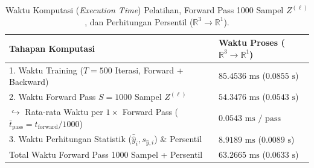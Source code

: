 \documentclass[11pt,a4paper]{article}
\theoremstyle{plain}
\theoremstyle{definition}
\theoremstyle{remark}
\begin{document}
\begin{table}[H]
    \centering
    \small
    \caption{Waktu Komputasi (\textit{Execution Time}) Pelatihan, Forward Pass 1000 Sampel $Z^{(\ell)}$, dan Perhitungan Persentil ($\mathbb{R}^3 \to \mathbb{R}^1$).}
    \label{tab:waktu_komputasi}
    \begin{tabularx}{\textwidth}{l >{\centering\arraybackslash}X}
        \toprule
        \textbf{Tahapan Komputasi} & \textbf{Waktu Proses ($\mathbb{R}^3 \to \mathbb{R}^1$)} \\
        \midrule
        1. Waktu Training ($T = 500$ Iterasi, Forward + Backward) & $85.4536\text{ ms}$ ($0.0855\text{ s}$) \\
        2. Waktu Forward Pass $S = 1000$ Sampel $Z^{(\ell)}$ & $54.3476\text{ ms}$ ($0.0543\text{ s}$) \\
        \quad $\hookrightarrow$ Rata-rata Waktu per $1\times$ Forward Pass ($\bar{t}_{\text{pass}} = t_{\text{forward}} / 1000$) & $0.0543\text{ ms / pass}$ \\
        3. Waktu Perhitungan Statistik ($\bar{\hat{y}}_i, s_{\hat{y}, i}$) \& Persentil & $8.9189\text{ ms}$ ($0.0089\text{ s}$) \\
        \midrule
        Total Waktu Forward Pass 1000 Sampel + Persentil & $63.2665\text{ ms}$ ($0.0633\text{ s}$) \\
        \bottomrule
    \end{tabularx}
\end{table}
\end{document}

